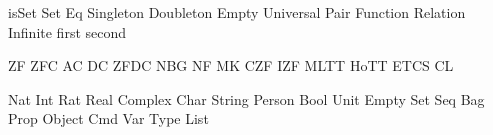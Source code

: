 \let\knuthsetminus=\setminus
\def\setminus{\mathbin{\knuthsetminus}}
\def\cantorcard#1{\overline{\overline{#1}}}
\def\cantorset{{\frak C}}
\def\continuum{\euf{c}}
\def\finord#1{\overline{#1}}
\def\eqc{\mathrel{=_{\namedop{c}}}}
\def\neqc{\mathrel{\not\eqc}}
\def\leqc{\mathrel{\leq_{\namedop{c}}}}
\def\geqc{\mathrel{\geq_{\namedop{c}}}}
\def\gtc{\mathrel{>_{\namedop{c}}}}
\def\ltc{\mathrel{<_{\namedop{c}}}}
\def\Univ{{\bbb V}}
\def\complement#1{\widetilde{#1}}
\let\compl=\complement
\def\russell#1{{\mathbf{r}(#1)}}
\def\metain{\mathrel{\in\kern-0.425em\in}}
\let\inclass=\metain
\def\classst#1#2{\pmbb{\{}\;{#1}\;\st \;{#2}\;\pmbb{\}}}
\def\classstt#1#2{\pmbb{\{}\;{#1}\;\st \;{\text{#2}}\;\pmbb{\}}}
\def\classimg#1#2{{#1}{\pmbb[}\,{#2}\,{\pmbb]}}
\let\clsimg=\classimg
\def\universet{{\cal U}}
\DefREL isSet Set
\DefRel Eq
\DefRel Singleton
\DefRel Doubleton
\DefRel Empty
\DefRel Universal
\DefRel Pair
\DefRel Function
\DefRel Relation
\DefRel Infinite
\DefFun first
\DefFun second
\def\kurpair#1#2{\set{\set{#1}, \set{{#1}, {#2}}}}
\def\disjunion{\mathbin{\uplus}}
\def\Disjunion{\mathop{\biguplus}}
\let\dunion=\disjunion
\let\Dunion=\Disjunion
\def\setsucc#1{{#1}{}^+}
\def\kleenestar#1{{#1}^\star}
\def\kleenestarp#1{\paren{#1}^\star}
\let\kstar=\kleenestar
\let\kstarp=\kleenestarp

\DefFou ZF
\DefFou ZFC
\DefFou AC
\DefFou DC
\DefFou ZFDC
\DefFou NBG
\DefFou NF
\DefFou MK
\DefFou CZF
\DefFou IZF
\DefFou MLTT
\DefFou HoTT
\DefFou ETCS
\DefFou CL
\def\ACN{\mathord{\AC}_\nats}

\DefType Nat
\DefType Int
\DefType Rat
\DefType Real
\DefType Complex
\DefType Char
\DefType String
\DefType Person
\DefType Bool
\DefType Unit
\DefType Empty
\DefType Set
\DefType Seq
\DefType Bag
\DefType Prop
\DefType Object
\DefType Cmd
\DefType Var
\DefType Type
\DefType List
\def\lnil{\mathord{[\,]}}%
\def\lcons{\mathbin{\doublecolon}}%
\def\list#1{\bracket{#1}}
\def\oftype{\mathrel{:}}
\let\is=\oftype
\let\hastype=\is
\def\namedrule#1{{\scshape #1}}
\def\rulelabel#1{{\smaller\scshape #1}}
\let\cons=\namedcons
\let\type=\namedtype
\let\fun=\namedfun
\let\var=\namedvar

